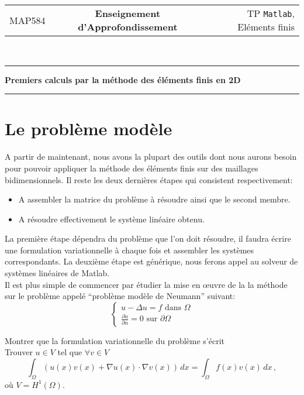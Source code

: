 \documentclass[a4paper,french,sumlimits,12pt]{article}
\begin{document}
\noindent
\begin{tabular}{lcr}
MAP584\hspace*{0.8cm}&\textbf{Enseignement d'Approfondissement}&\hspace*{0.8cm}TP \texttt{Matlab}, Eléments finis 
\end{tabular}\\
\rule[0.5ex]{\textwidth}{0.2mm}

\begin{center}
{\Large{ \bf Premiers calculs par la méthode des éléments finis en 2D}}
\end{center}



\hrule
\vspace*{0.3cm}

\section{Le problème modèle}
A partir de maintenant, nous avons la plupart des outils dont nous aurons besoin pour pouvoir appliquer la méthode des éléments finis sur des maillages bidimensionnels. Il reste les deux dernières étapes qui consistent respectivement: 
\begin{itemize}
\item A assembler la matrice du problème à résoudre ainsi que le second membre.
\item A résoudre effectivement le système linéaire obtenu.
\end{itemize}
La première étape dépendra du problème que l'on doit résoudre, il faudra écrire une formulation variationnelle à chaque fois et assembler les systèmes correspondants.
La deuxième étape est générique, nous ferons appel au solveur de systèmes linéaires de Matlab.\\

Il est plus simple de commencer par étudier la mise en \oe uvre de la la méthode sur le problème appelé ``problème modèle de Neumann'' suivant:
\begin{equation}
\left\{
\begin{array}{l}
u-\Delta u = f \mbox{ dans } \Omega\\
\frac{\partial u}{\partial n} = 0\mbox{ sur }\partial \Omega
\end{array}
\right.
\label{pbmodele}
\end{equation}

 Montrer que la formulation variationnelle du problème s'écrit\\
Trouver $u \in V$ tel que $\forall v \in V$
$$
\int_{\Omega} \left(u(x)v(x)+\nabla u(x)\cdot \nabla v(x)\right)\,dx = \int_\Omega f(x)v(x)\,dx\,,
$$ 
où $V=H^1(\Omega)$.\\
\end{document}
